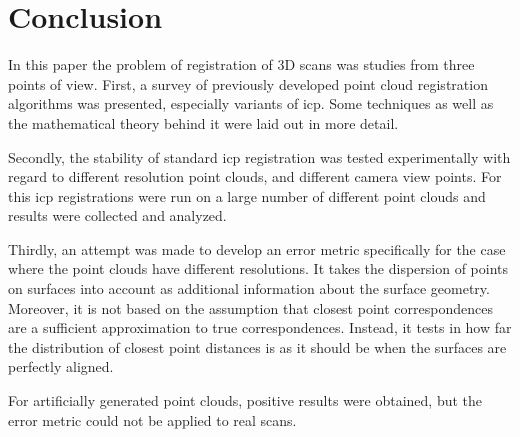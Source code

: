 \chapter{Conclusion}
In this paper the problem of registration of 3D scans was studies from three points of view. First, a survey of previously developed point cloud registration algorithms was presented, especially variants of \gls{icp}. Some techniques as well as the mathematical theory behind it were laid out in more detail. 

Secondly, the stability of standard \gls{icp} registration was tested experimentally with regard to different resolution point clouds, and different camera view points. For this \gls{icp} registrations were run on a large number of different point clouds and results were collected and analyzed.

Thirdly, an attempt was made to develop an error metric specifically for the case where the point clouds have different resolutions. It takes the dispersion of points on surfaces into account as additional information about the surface geometry. Moreover, it is not based on the assumption that closest point correspondences are a sufficient approximation to true correspondences. Instead, it tests in how far the distribution of closest point distances is as it should be when the surfaces are perfectly aligned.

For artificially generated point clouds, positive results were obtained, but the error metric could not be applied to real scans.
